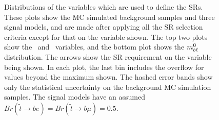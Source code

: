 \begin{figure}
\centering
{}
\caption{Distributions of the variables which are used to define the
  SRs. These plots show the MC simulated background samples and
  three signal models, and are made after applying all the SR
  selection criteria except for that on the variable shown. The top
  two plots show the \HT\ and \MBLASYM\ variables, and the bottom plot shows
  the $m_{b\ell}^0$ distribution.
  The arrows show the SR requirement on the variable being shown.
  In each plot, the last bin includes the overflow for values beyond the
  maximum shown. The hashed error bands show only the statistical
  uncertainty on the background MC simulation samples. The signal
  models have an assumed
  $Br(\tilde{t}\rightarrow be) = Br(\tilde{t}\rightarrow b\mu) = 0.5$.
}
\label{fig:n_minus_one_sr}
\end{figure}


